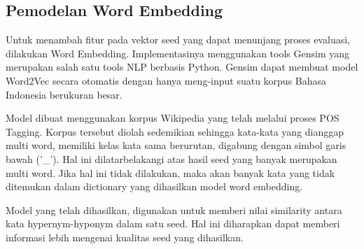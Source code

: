 \subsection{Pemodelan Word Embedding}
Untuk menambah fitur pada vektor seed yang dapat menunjang proses evaluasi, dilakukan Word Embedding. Implementasinya menggunakan tools Gensim yang merupakan salah satu tools NLP berbasis Python. Gensim dapat membuat model Word2Vec secara otomatis dengan hanya meng-input suatu korpus Bahasa Indonesia berukuran besar.

Model dibuat menggunakan korpus Wikipedia yang telah melalui proses POS Tagging. Korpus tersebut diolah sedemikian sehingga kata-kata yang dianggap multi word, memiliki kelas kata sama berurutan, digabung dengan simbol garis bawah ('\_'). Hal ini dilatarbelakangi atas hasil seed yang banyak merupakan multi word. Jika hal ini tidak dilakukan, maka akan banyak kata yang tidak ditemukan dalam dictionary yang dihasilkan model word embedding.

Model yang telah dihasilkan, digunakan untuk memberi nilai similarity antara kata hypernym-hyponym dalam satu seed. Hal ini diharapkan dapat memberi informasi lebih mengenai kualitas seed yang dihasilkan.
